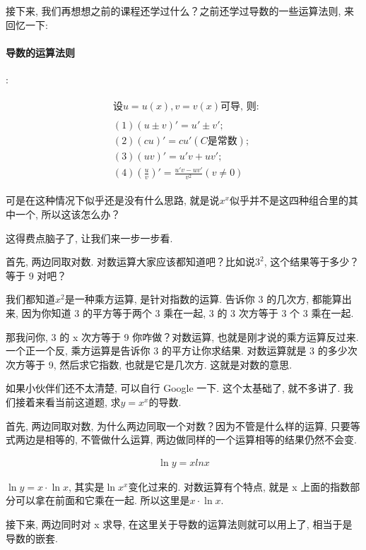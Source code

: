 接下来, 我们再想想之前的课程还学过什么？之前还学过导数的一些运算法则, 来回忆一下: 

\paragraph{导数的运算法则}:

\begin{align*}
	\begin{split}
    & \mbox{设} u = u(x), v = v(x)\mbox{可导, 则: }\\ \\
    & (1) (u\pm v)' = u'\pm v' ; \\
    & (2) (cu)' = cu' (C\mbox{是常数}); \\
    & (3) (uv)' = u'v+uv'; \\
    & (4)(\frac{u}{v})' = \frac{u'v-uv'}{v^2}(v \ne 0)
	\end{split}
\end{align*}

可是在这种情况下似乎还是没有什么思路, 就是说$x^x$似乎并不是这四种组合里的其中一个, 所以这该怎么办？

这得费点脑子了, 让我们来一步一步看. 

首先, 两边同取对数. 对数运算大家应该都知道吧？比如说$3^2$, 这个结果等于多少？等于 9 对吧？

我们都知道$x^2$是一种乘方运算, 是针对指数的运算. 告诉你 3 的几次方, 都能算出来, 因为你知道 3 的平方等于两个 3 乘在一起, 3 的 3 次方等于 3 个 3 乘在一起. 

那我问你, 3 的 x 次方等于 9 你咋做？对数运算, 也就是刚才说的乘方运算反过来. 一个正一个反, 乘方运算是告诉你 3 的平方让你求结果. 对数运算就是 3 的多少次次方等于 9, 然后求它指数, 也就是它是几次方. 这就是对数的意思. 

如果小伙伴们还不太清楚, 可以自行 Google 一下. 这个太基础了, 就不多讲了. 我们接着来看当前这道题, 求$y=x^x$的导数. 

首先, 两边同取对数, 为什么两边同取一个对数？因为不管是什么样的运算, 只要等式两边是相等的, 不管做什么运算, 两边做同样的一个运算相等的结果仍然不会变.

\begin{align*}
  \ln y = x ln x
\end{align*}

$\ln y = x \cdot \ln x$, 其实是$\ln x^x$变化过来的. 对数运算有个特点, 就是 x 上面的指数部分可以拿在前面和它乘在一起. 所以这里是$x \cdot \ln x$.

接下来, 两边同时对 x 求导, 在这里关于导数的运算法则就可以用上了, 相当于是导数的嵌套.

